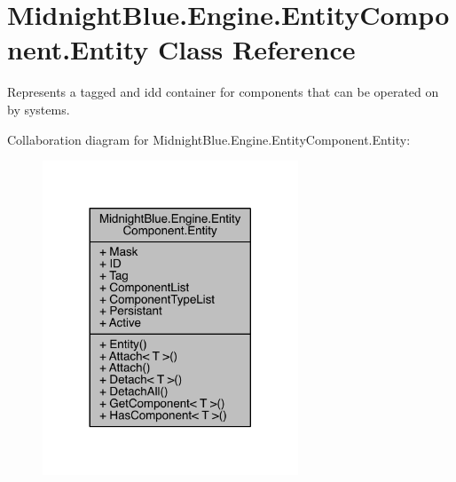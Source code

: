 \hypertarget{class_midnight_blue_1_1_engine_1_1_entity_component_1_1_entity}{}\section{Midnight\+Blue.\+Engine.\+Entity\+Component.\+Entity Class Reference}
\label{class_midnight_blue_1_1_engine_1_1_entity_component_1_1_entity}


Represents a tagged and id\textquotesingle{}d container for components that can be operated on by systems.  




Collaboration diagram for Midnight\+Blue.\+Engine.\+Entity\+Component.\+Entity\+:
\nopagebreak
\begin{figure}[H]
\begin{center}
\leavevmode
\includegraphics[width=216pt]{class_midnight_blue_1_1_engine_1_1_entity_component_1_1_entity__coll__graph}
\end{center}
\end{figure}
